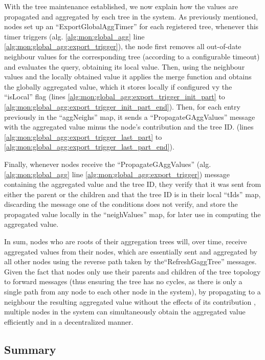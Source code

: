 With the tree maintenance established, we now explain how the values are propagated and aggregated by each tree in the system. As previously mentioned, nodes set up an ``ExportGlobalAggTimer'' for each registered tree, whenever this timer triggers (alg.  \ref{alg:mon:global_agg} line \ref{alg:mon:global_agg:export_trigger}), the node first removes all out-of-date neighbour values for the corresponding tree (according to a configurable timeout) and evaluates the query, obtaining its local value. Then, using the neighbour values and the locally obtained value it applies the merge function and obtains the globally aggregated value, which it stores locally if configured vy the ``isLocal'' flag (lines \ref{alg:mon:global_agg:export_trigger_init_part} to \ref{alg:mon:global_agg:export_trigger_init_part_end}). Then, for each entry previously in the ``aggNeighs'' map, it sends a ``PropagateGAggValues'' message with the aggregated value minus the node's contribution and the tree ID. (lines \ref{alg:mon:global_agg:export_trigger_last_part} to \ref{alg:mon:global_agg:export_trigger_last_part_end}). 

Finally, whenever nodes receive the ``PropagateGAggValues'' (alg. \ref{alg:mon:global_agg} line \ref{alg:mon:global_agg:export_trigger}) message containing the aggregated value and the tree ID, they verify that it was sent from either the parent or the children and that the tree ID is in their local ``tIds'' map, discarding the message one of the conditions does not verify, and store the propagated value locally in the ``neighValues'' map, for later use in computing the aggregated value.

In sum, nodes who are roots of their aggregation trees will, over time, receive aggregated values from their nodes, which are essentially sent and aggregated by all other nodes using the reverse path taken by the``RefreshGaggTree'' messages. Given the fact that nodes only use their parents and children of the tree topology to forward messages (thus ensuring the tree has no cycles, as there is only a single path from any node to each other node in the system), by propagating to a neighbour the resulting aggregated value without the effects of its contribution , multiple nodes in the system can simultaneously obtain the aggregated value efficiently and in a decentralized manner.

\subsection{Summary}

